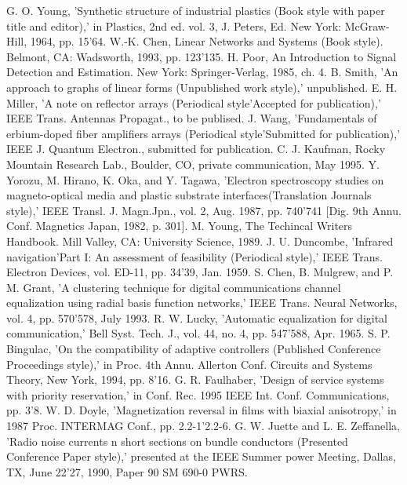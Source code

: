 \documentclass[letterpaper, 10 pt, conference]{ieeeconf}  %
\begin{document}
\begin{thebibliography}{99}

 G. O. Young, 'Synthetic structure of industrial plastics (Book style with paper title and editor),' 	in Plastics, 2nd ed. vol. 3, J. Peters, Ed.  New York: McGraw-Hill, 1964, pp. 15'64.
 W.-K. Chen, Linear Networks and Systems (Book style).	Belmont, CA: Wadsworth, 1993, pp. 123'135.
 H. Poor, An Introduction to Signal Detection and Estimation.   New York: Springer-Verlag, 1985, ch. 4.
 B. Smith, 'An approach to graphs of linear forms (Unpublished work style),' unpublished.
 E. H. Miller, 'A note on reflector arrays (Periodical style'Accepted for publication),' IEEE Trans. Antennas Propagat., to be publised.
 J. Wang, 'Fundamentals of erbium-doped fiber amplifiers arrays (Periodical style'Submitted for publication),' IEEE J. Quantum Electron., submitted for publication.
 C. J. Kaufman, Rocky Mountain Research Lab., Boulder, CO, private communication, May 1995.
 Y. Yorozu, M. Hirano, K. Oka, and Y. Tagawa, 'Electron spectroscopy studies on magneto-optical media and plastic substrate interfaces(Translation Journals style),' IEEE Transl. J. Magn.Jpn., vol. 2, Aug. 1987, pp. 740'741 [Dig. 9th Annu. Conf. Magnetics Japan, 1982, p. 301].
 M. Young, The Techincal Writers Handbook.  Mill Valley, CA: University Science, 1989.
 J. U. Duncombe, 'Infrared navigation'Part I: An assessment of feasibility (Periodical style),' IEEE Trans. Electron Devices, vol. ED-11, pp. 34'39, Jan. 1959.
 S. Chen, B. Mulgrew, and P. M. Grant, 'A clustering technique for digital communications channel equalization using radial basis function networks,' IEEE Trans. Neural Networks, vol. 4, pp. 570'578, July 1993.
 R. W. Lucky, 'Automatic equalization for digital communication,' Bell Syst. Tech. J., vol. 44, no. 4, pp. 547'588, Apr. 1965.
 S. P. Bingulac, 'On the compatibility of adaptive controllers (Published Conference Proceedings style),' in Proc. 4th Annu. Allerton Conf. Circuits and Systems Theory, New York, 1994, pp. 8'16.
 G. R. Faulhaber, 'Design of service systems with priority reservation,' in Conf. Rec. 1995 IEEE Int. Conf. Communications, pp. 3'8.
 W. D. Doyle, 'Magnetization reversal in films with biaxial anisotropy,' in 1987 Proc. INTERMAG Conf., pp. 2.2-1'2.2-6.
 G. W. Juette and L. E. Zeffanella, 'Radio noise currents n short sections on bundle conductors (Presented Conference Paper style),' presented at the IEEE Summer power Meeting, Dallas, TX, June 22'27, 1990, Paper 90 SM 690-0 PWRS.

\end{thebibliography}
\end{document}

